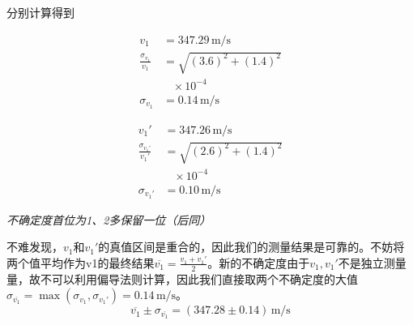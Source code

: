 \documentclass[10pt, twocolumn]{article}
\begin{document}
\par
分别计算得到\\
\begin{minipage}{0.23\textwidth}
    \begin{equation*}
        \begin{aligned}
            v_1&=347.29\,\text{m/s}\\
            \frac{\sigma_{v_1}}{v_1}&=\sqrt{(3.6)^2+(1.4)^2}\\
            &\;\;\;\times 10^{-4} \\
            \sigma_{v_1}&=0.14\,\text{m/s}
        \end{aligned}
    \end{equation*}
    \end{minipage}
    \begin{minipage}{0.23\textwidth}
    \begin{equation*}
        \begin{aligned}
            v_1'&=347.26\,\text{m/s}\\
            \frac{\sigma_{v_1'}}{v_1'}&=\sqrt{(2.6)^2+(1.4)^2}\\
                        &\;\;\;\times 10^{-4} \\
            \sigma_{v_1'}&=0.10\,\text{m/s}
        \end{aligned}
    \end{equation*}
\end{minipage}
\emph{不确定度首位为1、2多保留一位（后同）}
\par
不难发现，$v_1$和$v_1'$的真值区间是重合的，因此我们的测量结果是可靠的。不妨将两个值平均作为v1的最终结果$\overline{v_1}=\frac{v_1+v_1'}{2}$。新的不确定度由于$v_1,v_1'$不是独立测量量，故不可以利用偏导法则计算，因此我们直接取两个不确定度的大值$\sigma_{\overline{v_1}}=\max(\sigma_{v_1},\sigma_{v_1'})=0.14\,\text{m/s}$。
\begin{equation}
    \overline{v_1} \pm \sigma_{\overline{v_1}} = (347.28 \pm 0.14) \, \text{m/s}   
\end{equation}
\end{document}
